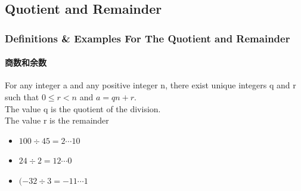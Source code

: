 \documentclass[
	11pt, %
]{beamer}
\begin{document}


\subsection{Quotient and Remainder}

\begin{frame}
	\frametitle{Definitions \& Examples For The Quotient and Remainder}
	\framesubtitle{商数和余数}
	
	\begin{definition}
	For any integer a and any \alert{positive} integer n, there exist unique integers q and r such that \alert{$0\leq r < n$} and $a = qn + r$. \\
	The value q is the quotient of the division. \\ The value r is the remainder
	\end{definition}
	
	\smallskip %
	
	\begin{example}
		\begin{itemize}
			\item $100 \div 45 = 2 \cdots 10 $
			\item $24 \div 2 = 12 \cdots 0 $ 
			\item $ (-32 \div 3 = -11 \cdots 1 $ 
		\end{itemize}
	\end{example}
\end{frame}

\end{document}
